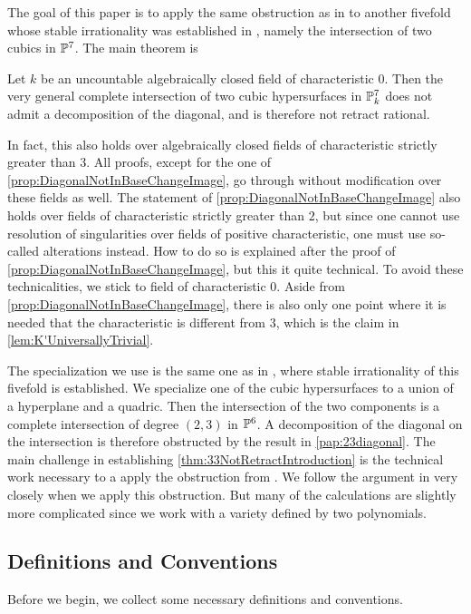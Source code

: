 The goal of this paper is to apply the same obstruction as in \cite{PavicSchreieder} to another fivefold whose stable irrationality was established in \cite{NicaiseOttem}, namely the intersection of two cubics in $\P^7$. The main theorem is
\begin{theorem}[{= \cref{cor:33NotRetractRational}}]
  \label{thm:33NotRetractIntroduction}  
  Let $k$ be an uncountable algebraically closed field of characteristic $0$. Then the very general complete intersection of two cubic hypersurfaces in $\P^7_k$ does not admit a decomposition of the diagonal, and is therefore not retract rational.
\end{theorem}
In fact, this also holds over algebraically closed fields of characteristic strictly greater than $3$. All proofs, except for the one of \cref{prop:DiagonalNotInBaseChangeImage}, go through without modification over these fields as well. The statement of \cref{prop:DiagonalNotInBaseChangeImage} also holds over fields of characteristic strictly greater than $2$, but since one cannot use resolution of singularities over fields of positive characteristic, one must use so-called alterations instead. How to do so is explained after the proof of \cref{prop:DiagonalNotInBaseChangeImage}, but this it quite technical. To avoid these technicalities, we stick to field of characteristic 0. Aside from \cref{prop:DiagonalNotInBaseChangeImage}, there is also only one point where it is needed that the characteristic is different from $3$, which is the claim in \cref{lem:K'UniversallyTrivial}. 

The specialization we use is the same one as in \cite[Theorem 7.2]{NicaiseOttem}, where stable irrationality of this fivefold is established. We specialize one of the cubic hypersurfaces to a union of a hyperplane and a quadric. Then the intersection of the two components is a complete intersection of degree $(2,3)$ in $\P^6$. A decomposition of the diagonal on the intersection is therefore obstructed by the result in \cref{pap:23diagonal}. The main challenge in establishing \cref{thm:33NotRetractIntroduction} is the technical work necessary to a apply the obstruction from \cite{PavicSchreieder}. We follow the argument in \cite{PavicSchreieder} very closely when we apply this obstruction. But many of the calculations are slightly more complicated since we work with a variety defined by two polynomials.

\subsection{Definitions and Conventions}
Before we begin, we collect some necessary definitions and conventions.

